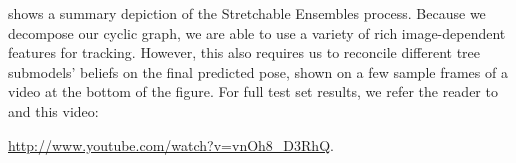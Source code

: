  shows a summary depiction of the Stretchable Ensembles 
process.  Because we decompose our cyclic graph, we are able to use a variety 
of rich image-dependent features for tracking.  However, this also requires us 
to reconcile different tree submodels' beliefs on the final predicted pose, 
shown on a few sample frames of a video at the bottom of the figure.  For full 
test set results, we refer the reader to  and this video:
\begin{center}
\url{http://www.youtube.com/watch?v=vnOh8_D3RhQ}.
\end{center}

